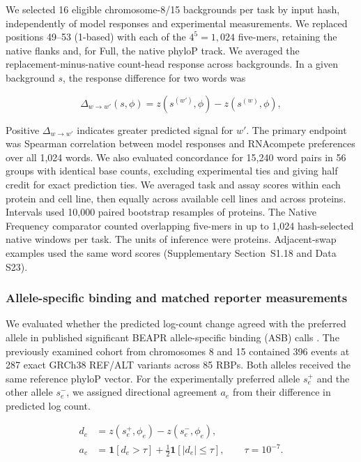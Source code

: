 \documentclass[webpdf,contemporary,large]{current_assets/oup-authoring-template}
\newcommand{\supsect}[1]{Supplementary Section~#1}
\begin{document}
We selected 16 eligible chromosome-8/15 backgrounds per task by input hash, independently of model responses and experimental measurements. We replaced positions 49--53 (1-based) with each of the $4^5=1,024$ five-mers, retaining the native flanks and, for Full, the native phyloP track. We averaged the replacement-minus-native count-head response across backgrounds. In a given background $s$, the response difference for two words was

\begin{equation}
\Delta_{w\to w'}(s,\phi)
=z(s^{(w')},\phi)-z(s^{(w)},\phi),
\label{eq:word_response}
\end{equation}

Positive $\Delta_{w\to w'}$ indicates greater predicted signal for $w'$. The primary endpoint was Spearman correlation between model responses and RNAcompete preferences over all 1,024 words. We also evaluated concordance for 15,240 word pairs in 56 groups with identical base counts, excluding experimental ties and giving half credit for exact prediction ties. We averaged task and assay scores within each protein and cell line, then equally across available cell lines and across proteins. Intervals used 10,000 paired bootstrap resamples of proteins. The Native Frequency comparator counted overlapping five-mers in up to 1,024 hash-selected native windows per task. The units of inference were proteins. Adjacent-swap examples used the same word scores (\supsect{S1.18} and Data S23).

\subsubsection{Allele-specific binding and matched reporter measurements}\label{subsec:variant_methods}

We evaluated whether the predicted log-count change agreed with the preferred allele in published significant BEAPR allele-specific binding (ASB) calls \citep{yang2019asb}. The previously examined cohort from chromosomes 8 and 15 contained 396 events at 287 exact GRCh38 REF/ALT variants across 85 RBPs. Both alleles received the same reference phyloP vector. For the experimentally preferred allele $s_e^+$ and the other allele $s_e^-$, we assigned directional agreement $a_e$ from their difference in predicted log count.

\begin{equation}
\begin{aligned}
d_e&=z(s_e^+,\phi_e)-z(s_e^-,\phi_e),\\
a_e&=\mathbf1[d_e>\tau]
+\tfrac12\mathbf1[|d_e|\leq\tau],
\qquad \tau=10^{-7}.
\end{aligned}
\label{eq:allele_direction}
\end{equation}
\end{document}
